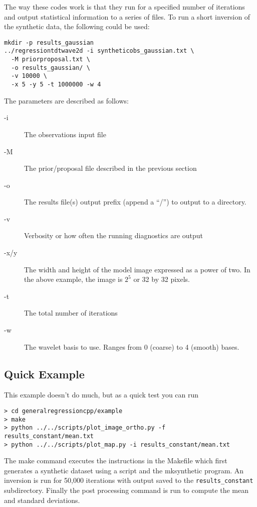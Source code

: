 \documentclass{article}
\begin{document}
The way these codes work is that they run for a specified number of
iterations and output statistical information to a series of files.
To run a short inversion of the synthetic data, the following
could be used:

\begin{verbatim}
mkdir -p results_gaussian
../regressiontdtwave2d -i syntheticobs_gaussian.txt \
  -M priorproposal.txt \
  -o results_gaussian/ \
  -v 10000 \
  -x 5 -y 5 -t 1000000 -w 4
\end{verbatim}

The parameters are described as follows:

\begin{description}
\item [-i] The observations input file
\item [-M] The prior/proposal file described in the previous section
\item [-o] The results file(s) output prefix (append a ``/'') to output to a
  directory.
\item [-v] Verbosity or how often the running diagnostics are output
\item [-x/y] The width and height of the model image expressed as a power of two. In
  the above example, the image is $2^5$ or 32 by 32 pixels.
\item [-t] The total number of iterations
\item [-w] The wavelet basis to use. Ranges from 0 (coarse) to 4 (smooth) bases.
\end{description}


\subsection{Quick Example}

This example doesn't do much, but as a quick test you can run

\begin{verbatim}
> cd generalregressioncpp/example
> make
> python ../../scripts/plot_image_ortho.py -f results_constant/mean.txt
> python ../../scripts/plot_map.py -i results_constant/mean.txt
\end{verbatim}

The make command executes the instructions in the Makefile
which first generates a synthetic dataset using a script
and the mksynthetic program. An inversion is run for 50,000
iterations with output saved to the {\tt results\_constant}
subdirectory. Finally the post processing command is run to
compute the mean and standard deviations.
\end{document}
